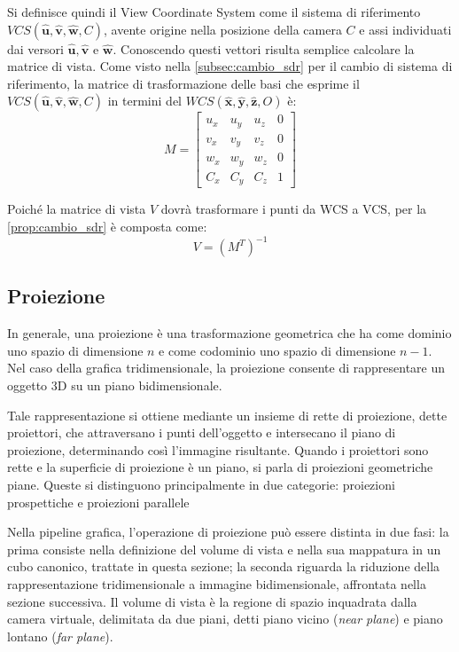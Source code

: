 Si definisce quindi il View Coordinate System come il sistema di riferimento $VCS (\hat{\mathbf{u}}, \hat{\mathbf{v}}, \hat{\mathbf{w}}, C)$, avente origine nella posizione della camera $C$ e assi individuati dai versori $\hat{\mathbf{u}}, \hat{\mathbf{v}}$ e $\hat{\mathbf{w}}$.
Conoscendo questi vettori risulta semplice calcolare la matrice di vista.
Come visto nella \cref{subsec:cambio_sdr} per il cambio di sistema di riferimento, la matrice di trasformazione delle basi che esprime il $VCS (\hat{\mathbf{u}}, \hat{\mathbf{v}}, \hat{\mathbf{w}}, C)$ in termini del $WCS (\hat{\mathbf{x}}, \hat{\mathbf{y}}, \hat{\mathbf{z}}, O)$ è:
\[
M =
\begin{bmatrix}
    u_x & u_y & u_z & 0 \\
    v_x & v_y & v_z & 0 \\
    w_x & w_y & w_z & 0 \\
    C_x & C_y & C_z & 1
\end{bmatrix}
\]

Poiché la matrice di vista $V$ dovrà trasformare i punti da WCS a VCS, per la \cref{prop:cambio_sdr} è composta come:
\[
V =
(M^T)^{-1}
\]

\subsection{Proiezione}
\label{subsec:proiezione}
In generale, una proiezione è una trasformazione geometrica che ha come dominio uno spazio di dimensione $n$ e come codominio uno spazio di dimensione $n-1$.
Nel caso della grafica tridimensionale, la proiezione consente di rappresentare un oggetto 3D su un piano bidimensionale.

Tale rappresentazione si ottiene mediante un insieme di rette di proiezione, dette proiettori, che attraversano i punti dell’oggetto e intersecano il piano di proiezione, determinando così l’immagine risultante.
Quando i proiettori sono rette e la superficie di proiezione è un piano, si parla di proiezioni geometriche piane.
Queste si distinguono principalmente in due categorie: proiezioni prospettiche e proiezioni parallele

Nella pipeline grafica, l’operazione di proiezione può essere distinta in due fasi: la prima consiste nella definizione del volume di vista e nella sua mappatura in un cubo canonico, trattate in questa sezione; la seconda riguarda la riduzione della rappresentazione tridimensionale a immagine bidimensionale, affrontata nella sezione successiva.
Il volume di vista è la regione di spazio inquadrata dalla camera virtuale, delimitata da due piani, detti piano vicino (\emph{near plane}) e piano lontano (\emph{far plane}).


